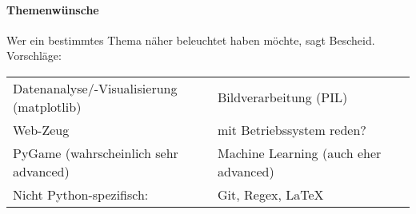 \documentclass{article}
\begin{document}
\newpage
\paragraph{Themenwünsche}
	Wer ein bestimmtes Thema näher beleuchtet haben möchte, sagt Bescheid. Vorschläge: \\
	\begin{tabular}{ll}
		Datenanalyse/-Visualisierung (matplotlib) &
		Bildverarbeitung (PIL) \\
		Web-Zeug &
		mit Betriebssystem reden? \\
		PyGame (wahrscheinlich sehr advanced) &
		Machine Learning (auch eher advanced) \\
		Nicht Python-spezifisch: & Git, Regex, \LaTeX
	\end{tabular}
\end{document}
